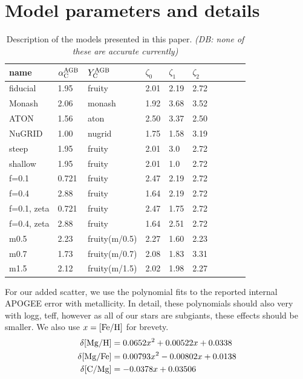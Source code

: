 \documentclass[fleqn,
usenatbib]{mnras}
\newcommand{\dbnote}[1]{ {\color{Thistle} \textit{\small (DB: #1)}} }
\begin{document}

\appendix


\section{Model parameters and details}

\begin{table}
	\centering
        \caption[]{Description of the models presented in this paper. \dbnote{none of these are accurate currently}}
	\label{tab:model_parameters}

	\begin{tabular}{l l l l l l l l l l}
		\hline
            name & $\alpha_{\rm C}^{\rm AGB}$ & $Y_{\rm C}^{\rm AGB}$ & $\zeta_0$ & $\zeta_1$ & $\zeta_2$ \\ 
            \hline
            fiducial & 1.95 & fruity & 2.01 & 2.19 & 2.72 \\
            Monash & 2.06 & monash & 1.92 & 3.68 & 3.52 \\
            ATON & 1.56 & aton & 2.50 & 3.37 & 2.50 \\
            NuGRID & 1.00 & nugrid & 1.75 & 1.58 & 3.19 \\
            steep & 1.95 & fruity & 2.01 & 3.0 & 2.72 \\
            shallow & 1.95 & fruity & 2.01 & 1.0 & 2.72 \\
            f=0.1 & 0.721 & fruity & 2.47 & 2.19 & 2.72  \\
            f=0.4 & 2.88 & fruity & 1.64 & 2.19 & 2.72 \\
            f=0.1, zeta & 0.721 & fruity & 2.47 & 1.75 & 2.72  \\
            f=0.4, zeta & 2.88 & fruity & 1.64 & 2.51 & 2.72 \\
            m0.5 & 2.23 & fruity(m/0.5)  & 2.27 & 1.60 & 2.23 \\
            m0.7 & 1.73 & fruity(m/0.7) & 2.08 & 1.83 & 3.31 \\
            m1.5 & 2.12 & fruity(m/1.5) & 2.02 & 1.98 & 2.27 \\
		\hline
	\end{tabular}
\end{table}



For our added scatter, we use the polynomial fits to the reported internal APOGEE error with metallicity. In detail, these polynomials should also very with logg, teff, however as all of our stars are subgiants, these effects should be smaller. We also use $x={\rm [Fe/H]}$ for brevety.
\begin{subequations}
\begin{align}
    \delta {\rm [Mg/H]} &= 0.0652 x^2 + 0.00522 x + 0.0338 \\
    \delta {\rm [Mg/Fe]} &= 0.00793 x^2 - 0.00802 x + 0.0138 \\
    \delta {\rm [C/Mg]} &= -0.0378x + 0.03506 
\end{align}
\end{subequations}
\end{document}
